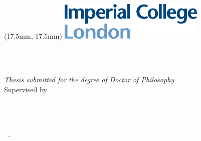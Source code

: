 \begin{titlepage}
    \begin{textblock*}{80mm}(17.5mm, 17.5mm)%
      \includegraphics[width=7cm]{gfx/imperial_logo}
    \end{textblock*} 
    \begin{center}
        \large  
        \hfill
        \vfill\vfill 

        \begingroup
            \color{Maroon}\spacedallcaps{\myTitle} \\ \bigskip
        \endgroup
        \spacedlowsmallcaps{\myName} \\ 

        \vfill\vfill

        \textit{Thesis submitted for the degree of Doctor of Philosophy} \\ 

        \vfill
        Supervised by \spacedlowsmallcaps{\myProf}\\ \medskip
        \myGroup \\
        \myDepartment \\
        \myUni \\ \bigskip

        \myTime\ -- \myVersion

    \end{center}  
\end{titlepage}   
